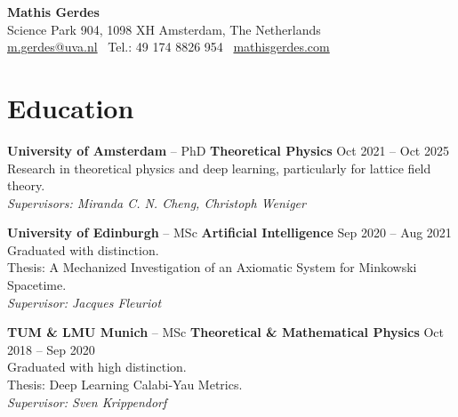 \documentclass[11pt, letterpaper]{article}
\newcommand{\dateright}[1]{\hfill{\small\color{accentblue} #1}}
\begin{document}
\begin{center}
    {\LARGE \textbf{Mathis Gerdes}} \\
    \vspace{0.15cm}
    Science Park 904, 1098 XH Amsterdam, The Netherlands \\
    \href{mailto:m.gerdes@uva.nl}{m.gerdes@uva.nl} \textbullet\
    Tel.: \raisebox{0.2\height}{\footnotesize +}49 174 8826 954 \textbullet\
    \href{http://www.mathisgerdes.com}{mathisgerdes.com}
\end{center}

\vspace{0.4cm}


\section*{Education}
\noindent
\textbf{University of Amsterdam} -- PhD \textbf{Theoretical Physics} \dateright{Oct 2021 -- Oct 2025} \\
Research in theoretical physics and deep learning, particularly for lattice field theory. \\
\textit{Supervisors: Miranda C. N. Cheng, Christoph Weniger}

\vspace{0.2cm}

\noindent
\textbf{University of Edinburgh} -- MSc \textbf{Artificial Intelligence} \dateright{Sep 2020 -- Aug 2021} \\
Graduated with distinction. \\
Thesis: A Mechanized Investigation of an Axiomatic System for Minkowski Spacetime. \\
\textit{Supervisor: Jacques Fleuriot}

\vspace{0.2cm}

\noindent
\textbf{TUM \& LMU Munich} -- MSc \textbf{Theoretical \& Mathematical Physics} \dateright{Oct 2018 -- Sep 2020} \\
Graduated with high distinction. \\
Thesis: Deep Learning Calabi-Yau Metrics. \\
\textit{Supervisor: Sven Krippendorf}
\end{document}
